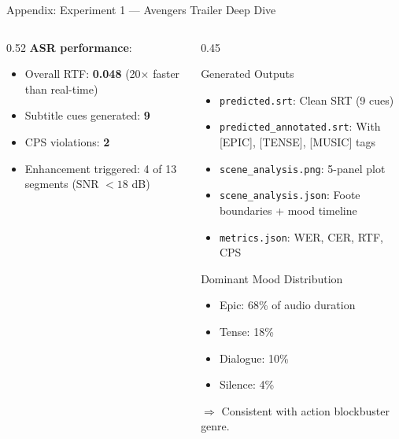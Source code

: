 \documentclass[aspectratio=169]{beamer}
\begin{document}
\begin{frame}{Appendix: Experiment 1 — Avengers Trailer Deep Dive}
\begin{columns}[T]
\begin{column}{0.52\textwidth}
      \vspace{0.3cm}
      \textbf{ASR performance}:
      \begin{itemize}
        \item Overall RTF: \textbf{0.048} (20$\times$ faster than real-time)
        \item Subtitle cues generated: \textbf{9}
        \item CPS violations: \textbf{2}
        \item Enhancement triggered: 4 of 13 segments (SNR $< 18$ dB)
      \end{itemize}
    \end{column}
    \begin{column}{0.45\textwidth}
      \begin{block}{Generated Outputs}
        \begin{itemize}
          \item \texttt{predicted.srt}: Clean SRT (9 cues)
          \item \texttt{predicted\_annotated.srt}: With [EPIC], [TENSE], [MUSIC] tags
          \item \texttt{scene\_analysis.png}: 5-panel plot
          \item \texttt{scene\_analysis.json}: Foote boundaries + mood timeline
          \item \texttt{metrics.json}: WER, CER, RTF, CPS
        \end{itemize}
      \end{block}
      \begin{block}{Dominant Mood Distribution}
        \begin{itemize}
          \item Epic: 68\% of audio duration
          \item Tense: 18\%
          \item Dialogue: 10\%
          \item Silence: 4\%
        \end{itemize}
        $\Rightarrow$ Consistent with action blockbuster genre.
      \end{block}
    \end{column}
  \end{columns}
\end{frame}
\end{document}
